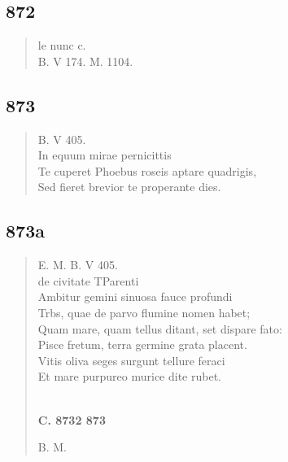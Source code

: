 \documentclass[11pt, a4paper]{report}
\begin{document}
            \subsection*{872}
      \begin{verse}
      le nunc c. \\ B. V 174. M. 1104. \\ 
      \end{verse}
  
            \subsection*{873}
      \begin{verse}
      B. V 405. \\ In equum mirae pernicittis \\ Te cuperet Phoebus roseis aptare quadrigis, \\ Sed fieret brevior te properante dies. \\ 
      \end{verse}
  
            \subsection*{873a}
      \begin{verse}
      E. M. B. V 405. \\ de civitate TParenti \\ Ambitur gemini sinuosa fauce profundi \\ Trbs, quae de parvo flumine nomen habet; \\ Quam mare, quam tellus ditant, set dispare fato: \\ Pisce fretum, terra germine grata placent. \\ Vitis oliva seges surgunt tellure feraci \\ Et mare purpureo murice dite rubet. \\ 
        ﻿\pagebreak 
    \begin{center} \textbf{C. 8732 873} \end{center} \marginpar{[319]} B. M. \\ 
      \end{verse}
  
\end{document}
